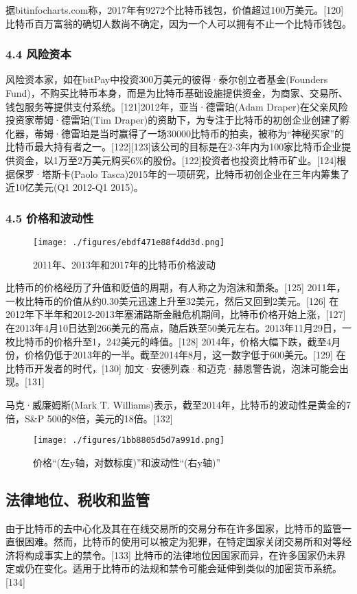 据bitinfocharts.com称，2017年有9272个比特币钱包，价值超过100万美元。[120] 比特币百万富翁的确切人数尚不确定，因为一个人可以拥有不止一个比特币钱包。
\subsubsection{4.4 风险资本}
风险资本家，如在bitPay中投资300万美元的彼得·泰尔创立者基金(Founders Fund)，不购买比特币本身，而是为比特币基础设施提供资金，为商家、交易所、钱包服务等提供支付系统。[121]2012年，亚当·德雷珀(Adam Draper)在父亲风险投资家蒂姆·德雷珀(Tim Draper)的资助下，为专注于比特币的初创企业创建了孵化器，蒂姆·德雷珀是当时赢得了一场30000比特币的拍卖，被称为“神秘买家”的比特币最大持有者之一。[122][123]该公司的目标是在2-3年内为100家比特币企业提供资金，以1万至2万美元购买6\%的股份。[122]投资者也投资比特币矿业。[124]根据保罗·塔斯卡(Paolo Tasca)2015年的一项研究，比特币初创企业在三年内筹集了近10亿美元(Q1 2012-Q1 2015)。
\subsubsection{4.5 价格和波动性}
\begin{figure}[ht]
\centering
\texttt{[image: ./figures/ebdf471e88f4dd3d.png]}
\caption{2011年、2013年和2017年的比特币价格波动} \label{fig_BTC_9}
\end{figure}
比特币的价格经历了升值和贬值的周期，有人称之为泡沫和萧条。[125] 2011年，一枚比特币的价值从约0.30美元迅速上升至32美元，然后又回到2美元。[126] 在2012年下半年和2012-2013年塞浦路斯金融危机期间，比特币价格开始上涨，[127] 在2013年4月10日达到266美元的高点，随后跌至50美元左右。2013年11月29日，一枚比特币的价格升至1，242美元的峰值。[128] 2014年，价格大幅下跌，截至4月份，价格仍低于2013年的一半。截至2014年8月，这一数字低于600美元。[129] 在比特币开发者的时代，[130] 加文·安德列森·和迈克·赫恩警告说，泡沫可能会出现。[131]

马克·威廉姆斯(Mark T. Williams)表示，截至2014年，比特币的波动性是黄金的7倍，S&P 500的8倍，美元的18倍。[132]
\begin{figure}[ht]
\centering
\texttt{[image: ./figures/1bb8805d5d7a991d.png]}
\caption{价格“(左y轴，对数标度)”和波动性“(右y轴)”} \label{fig_BTC_10}
\end{figure}

\subsection{法律地位、税收和监管}
由于比特币的去中心化及其在在线交易所的交易分布在许多国家，比特币的监管一直很困难。然而，比特币的使用可以被定为犯罪，在特定国家关闭交易所和对等经济将构成事实上的禁令。[133] 比特币的法律地位因国家而异，在许多国家仍未界定或仍在变化。适用于比特币的法规和禁令可能会延伸到类似的加密货币系统。[134]


